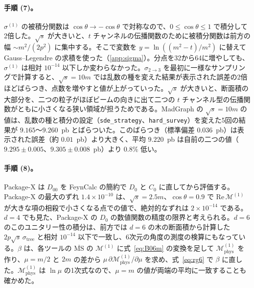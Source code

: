 \documentclass[a4paper,10pt]{ltjsarticle}
\begin{document}
\paragraph{手順 (7)。}$\sigma^{(1)}$ の被積分関数は $\cos\theta\to-\cos\theta$ で対称なので、$0\le\cos\theta\le1$ で積分して2倍した。$\sqrt s$ が大きいと、$t$ チャンネルの伝播関数のために被積分関数は前方の幅 $\sim m^2/(2p^2)$ に集中する。そこで変数を $y=\ln((m^2-t)/m^2)$ に替えて Gauss--Legendre の求積を使った（\ref{app:sigma}）。分点を32から64に増やしても、$\sigma^{(1)}$ は相対 $10^{-14}$ 以下しか変わらなかった。$\sigma_{2\to3}$ を最初に一様なサンプリングで計算すると、$\sqrt s=10m$ では乱数の種を変えた結果が表示された誤差の2倍ほどばらつき、点数を増やすと値が上がっていった。$\sqrt s$ が大きいと、断面積の大部分を、二つの粒子がほぼビームの向きに出て二つの $t$ チャンネル型の伝播関数がともに小さくなる狭い領域が担うためである。MadGraph の $\sqrt s=10m$ の値は、乱数の種と積分の設定（\texttt{sde\_strategy}、\texttt{hard\_survey}）を変えた5回の結果が $9.165$〜$9.260$~pb とばらついた。このばらつき（標準偏差 $0.036$~pb）は表示された誤差（約 $0.01$~pb）より大きく、平均 $9.220$~pb は自前の二つの値（$9.295\pm0.005$、$9.305\pm0.008$~pb）より $0.8\%$ 低い。

\paragraph{手順 (8)。}Package-X は $D_{00}$ を FeynCalc の簡約で $D_0$ と $C_0$ に直してから評価する。Package-X の最大のずれ $1.4\times10^{-10}$ は、$\sqrt s=2.5m$、$\cos\theta=0.9$ で $\mathrm{Re}\,\mathcal{M}^{(1)}$ が大きな項の相殺で小さくなる点での値で、絶対的なずれは $2\times10^{-14}$ である。$d=4$ でも見た、Package-X の $D_0$ の数値関数の精度の限界と考えられる。$d=6$ のこのユニタリー性の積分は、前方では $d=6$ の木の断面積から計算した $2p\sqrt s\,\sigma_{\mathrm{tree}}$ と相対 $10^{-14}$ 以下で一致し、6次元の角度の測度の検算にもなっている。$\beta$ は、各ツールの $\overline{\mathrm{MS}}$ の $\mathcal{M}^{(1)}$ に式~\eqref{eq:B06m} の変換を足して $\mathcal{M}^{(1)}_{\mathrm{phys}}$ を作り、$\mu=m/2$ と $2m$ の差から $\mu\,\partial\mathcal{M}^{(1)}_{\mathrm{phys}}/\partial\mu$ を求め、式~\eqref{eq:rg6} で $\beta$ に直した。$\mathcal{M}^{(1)}_{\mathrm{phys}}$ は $\ln\mu$ の1次式なので、$\mu=m$ の値が両端の平均に一致することも確かめた。
\end{document}
